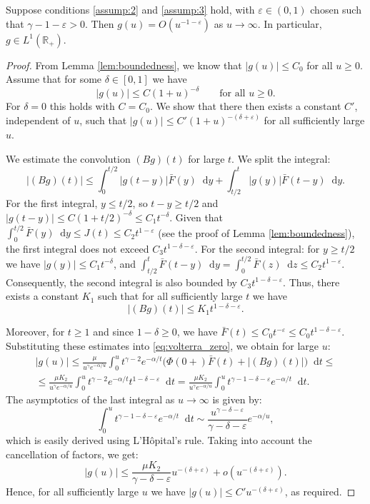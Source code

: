 \documentclass[smallextended]{svjour3}
\providecommand{\diff}{\mathop{}\!\mathrm{d}}
\begin{document}
\begin{lemma}\label{lem:iis}
Suppose conditions \ref{assump:2} and \ref{assump:3} hold, with $\varepsilon \in (0,1)$ chosen such that $\gamma-1-\varepsilon > 0$. Then $g(u) = O(u^{-1-\varepsilon})$ as $u \to \infty$. In particular, $g \in L^1(\mathbb{R}_+)$.
\end{lemma}
\begin{proof}
From Lemma \ref{lem:boundedness}, we know that $|g(u)| \le C_0$ for all $u\ge0$. Assume that for some $\delta \in [0,1]$ we have
\[
|g(u)| \le C (1+u)^{-\delta} \qquad \text{for all } u \ge 0.
\]
For $\delta = 0$ this holds with $C = C_0$. We show that there then exists a constant $C'$, independent of $u$, such that $|g(u)| \le C' (1+u)^{-(\delta+\varepsilon)}$ for all sufficiently large $u$.

We estimate the convolution $(Bg)(t)$ for large $t$. We split the integral:
\[
|(Bg)(t)| \le \int_0^{t/2} |g(t-y)| \bar F(y) \diff y + \int_{t/2}^t |g(y)| \bar F(t-y) \diff y.
\]
For the first integral, $y \le t/2$, so $t-y \ge t/2$ and $|g(t-y)| \le C (1+t/2)^{-\delta} \le C_1 t^{-\delta}$. Given that $\int_0^{t/2} \bar F(y) \diff y \le J(t) \le C_2 t^{1-\varepsilon}$ (see the proof of Lemma \ref{lem:boundedness}), the first integral does not exceed $C_3 t^{1-\delta-\varepsilon}$. For the second integral: for $y \ge t/2$ we have $|g(y)| \le C_1 t^{-\delta}$, and $\int_{t/2}^t \bar F(t-y) \diff y = \int_0^{t/2} \bar F(z) \diff z \le C_2 t^{1-\varepsilon}$. Consequently, the second integral is also bounded by $C_3 t^{1-\delta-\varepsilon}$. Thus, there exists a constant $K_1$ such that for all sufficiently large $t$ we have
\[
|(Bg)(t)| \le K_1 t^{1-\delta-\varepsilon}.
\]

Moreover, for $t \ge 1$ and since $1-\delta \ge 0$, we have $\bar F(t) \le C_0 t^{-\varepsilon} \le C_0 t^{1-\delta-\varepsilon}$. Substituting these estimates into \eqref{eq:volterra_zero}, we obtain for large $u$:
\begin{multline*}
|g(u)| \le \frac{\mu}{u^\gamma e^{-\alpha/u}} \int_0^u t^{\gamma-2} e^{-\alpha/t} \bigl( \Phi(0+)\bar F(t) + |(Bg)(t)| \bigr) \diff t \le
\\
\le \frac{\mu K_2}{u^\gamma e^{-\alpha/u}} \int_0^u t^{\gamma-2} e^{-\alpha/t} t^{1-\delta-\varepsilon} \diff t
= \frac{\mu K_2}{u^\gamma e^{-\alpha/u}} \int_0^u t^{\gamma-1-\delta-\varepsilon} e^{-\alpha/t} \diff t.
\end{multline*}
The asymptotics of the last integral as $u\to\infty$ is given by:
\[
\int_0^u t^{\gamma-1-\delta-\varepsilon} e^{-\alpha/t} \diff t \sim \frac{u^{\gamma-\delta-\varepsilon}}{\gamma-\delta-\varepsilon} e^{-\alpha/u},
\]
which is easily derived using L'Hôpital's rule. Taking into account the cancellation of factors, we get:
\[
|g(u)| \le \frac{\mu K_2}{\gamma-\delta-\varepsilon} u^{-(\delta+\varepsilon)} + o(u^{-(\delta+\varepsilon)}).
\]
Hence, for all sufficiently large $u$ we have $|g(u)| \le C' u^{-(\delta+\varepsilon)}$, as required.


\end{proof}
\end{document}
